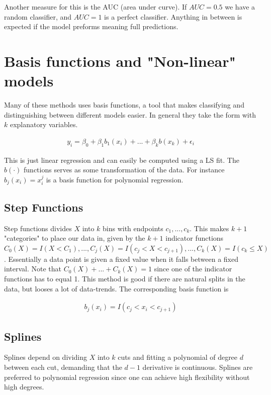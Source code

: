 \documentclass{article}
\begin{document}
Another measure for this is the AUC (area under curve). If $AUC = 0.5$ we have a random classifier, and $AUC = 1$ is a perfect classifier. Anything in between is expected if the model preforms meaning full predictions. 

\section{Basis functions and "Non-linear" models}

Many of these methods uses basis functions, a tool that makes classifying and distinguishing between different models easier. In general they take the form with $k$ explanatory variables.

\begin{align*}
    y_i = \beta_0 + \beta_1 b_1(x_i) + ... + \beta_k b(x_k) + \epsilon_i
\end{align*}

This is just linear regression and can easily be computed using a LS fit. The $b(\cdot)$ functions serves as some transformation of the data. For instance $b_j(x_i) = x_i^j$ is a basis function for polynomial regression. 

\subsection{Step Functions}
Step functions divides $X$ into $k$ bins with endpoints $c_1, ... , c_k$. This makes $k+1$ "categories" to place our data in, given by the $k+1$ indicator functions $C_0(X) = I(X < C_1), ..., C_j(X) = I(c_{j} < X < c_{j+1}), ... , C_k(X) = I(c_{k} \leq X)$. Essentially a data point is given a fixed value when it falls between a fixed interval. Note that $C_0(X) + ... + C_k(X) = 1$ since one of the indicator functions has to equal 1. This method is good if there are natural splits in the data, but looses a lot of data-trends. The corresponding basis function is 

\begin{align*}
    b_j(x_i) = I(c_j < x_i < c_{j+1})
\end{align*}

\subsection{Splines}
Splines depend on dividing $X$ into $k$ cuts and fitting a polynomial of degree $d$ between each cut, demanding that the $d-1$ derivative is continuous. Splines are preferred to polynomial regression since one can achieve high flexibility without high degrees.  
\end{document}
